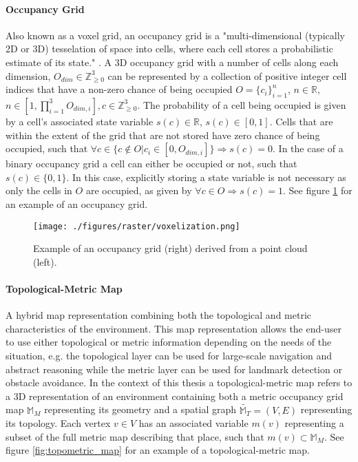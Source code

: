 \paragraph{Occupancy Grid} Also known as a voxel grid, an occupancy grid is a "multi-dimensional (typically 2D or 3D) tesselation of space into cells, where each cell stores a probabilistic estimate of its state." \citep{elfes_occupancy_1990}. A 3D occupancy grid with a number of cells along each dimension, \(O_{dim} \in \mathbb{Z}^3_{\geq0}\) can be represented by a collection of positive integer cell indices that have a non-zero chance of being occupied \(O=\{c_i\}_{i=1}^{n}\), \(n \in \mathbb{R}\), \(n \in [1, \prod_{i=1}^{3}O_{dim,i}], c \in \mathbb{Z}^3_{\geq 0} \). The probability of a cell being occupied is given by a cell's associated state variable \(s(c) \in \mathbb{R}\), \(s(c) \in [0,1]\). Cells that are within the extent of the grid that are not stored have zero chance of being occupied, such that \(\forall c \in \{c \notin O | c_i \in [0, O_{dim,i}]\} \Rightarrow s(c)=0\). In the case of a binary occupancy grid a cell can either be occupied or not, such that \(s(c) \in \{0,1\}\). In this case, explicitly storing a state variable is not necessary as only the cells in \(O\) are occupied, as given by \(\forall c \in O \Rightarrow s(c)=1\). See figure \ref{fig:voxel_example} for an example of an occupancy grid.

\begin{figure}[h]
    \centering
    \texttt{[image: ./figures/raster/voxelization.png]}
    \caption{Example of an occupancy grid (right) derived from a point cloud (left).}
    \label{fig:voxel_example}
\end{figure}

\paragraph{Topological-Metric Map} A hybrid map representation combining both the topological and metric characteristics of the environment. This map representation allows the end-user to use either topological or metric information depending on the needs of the situation, e.g. the topological layer can be used for large-scale navigation and abstract reasoning while the metric layer can be used for landmark detection or obstacle avoidance. In the context of this thesis a topological-metric map refers to a 3D representation of an environment containing both a metric occupancy grid map \(\mathbb{M}_M\) representing its geometry and a spatial graph \(\widetilde{\mathbb{M}_T}=(V, E)\) representing its topology. Each vertex \(v \in V\) has an associated variable \(m(v)\) representing a subset of the full metric map describing that place, such that \(m(v) \subset \mathbb{M}_M\). See figure \ref{fig:topometric_map} for an example of a topological-metric map.